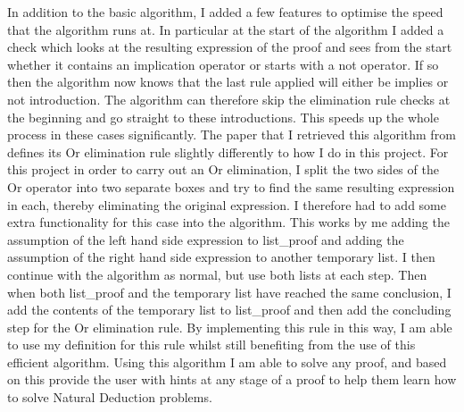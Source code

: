 In addition to the basic algorithm, I added a few features to optimise the speed that the algorithm runs at. In particular at the start of the algorithm I added a check which looks at the resulting expression of the proof and sees from the start whether it contains an implication operator or starts with a not operator. If so then the algorithm now knows that the last rule applied will either be implies or not introduction. The algorithm can therefore skip the elimination rule checks at the beginning and go straight to these introductions. This speeds up the whole process in these cases significantly. The paper that I retrieved this algorithm from defines its Or elimination rule slightly differently to how I do in this project. For this project in order to carry out an Or elimination, I split the two sides of the Or operator into two separate boxes and try to find the same resulting expression in each, thereby eliminating the original expression. I therefore had to add some extra functionality for this case into the algorithm. This works by me adding the assumption of the left hand side expression to list\_proof and adding the assumption of the right hand side expression to another temporary list. I then continue with the algorithm as normal, but use both lists at each step. Then when both list\_proof and the temporary list have reached the same conclusion, I add the contents of the temporary list to list\_proof and then add the concluding step for the Or elimination rule. By implementing this rule in this way, I am able to use my definition for this rule whilst still benefiting from the use of this efficient algorithm. Using this algorithm I am able to solve any proof, and based on this provide the user with hints at any stage of a proof to help them learn how to solve Natural Deduction problems. 

